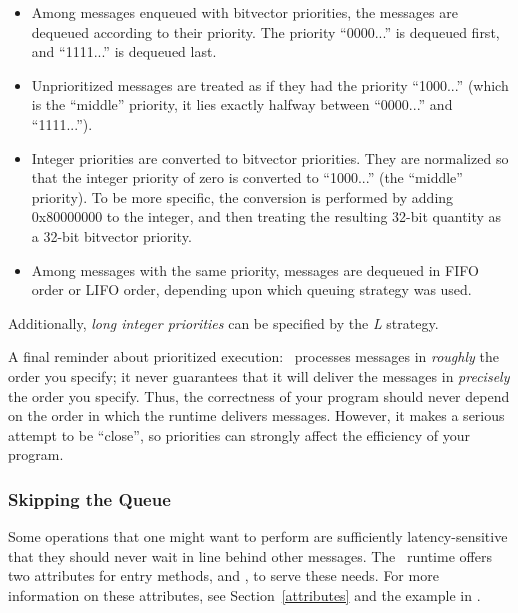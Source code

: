 \begin{itemize}

\item Among messages enqueued with bitvector priorities, the messages are
  dequeued according to their priority.  The priority ``0000...'' is dequeued
  first, and ``1111...'' is dequeued last.

\item Unprioritized messages are treated as if they had the priority
  ``1000...'' (which is the ``middle'' priority, it lies exactly halfway
  between ``0000...'' and ``1111...'').

\item Integer priorities are converted to bitvector priorities.  They are
  normalized so that the integer priority of zero is converted to ``1000...''
  (the ``middle'' priority).  To be more specific, the conversion is performed
  by adding 0x80000000 to the integer, and then treating the resulting 32-bit
  quantity as a 32-bit bitvector priority.

\item Among messages with the same priority, messages are dequeued in FIFO
  order or LIFO order, depending upon which queuing strategy was used.

\end{itemize}

Additionally, {\sl long integer priorities} can be specified by the {\em L}
strategy.

A final reminder about prioritized execution: \charmpp\ processes messages in
{\it roughly} the order you specify; it never guarantees that it will deliver
the messages in {\it precisely} the order you
specify. Thus, the correctness of your program should never depend on the order
in which the runtime delivers messages. However, it makes a serious attempt to
be ``close'', so priorities can strongly affect the efficiency of your program.

\subsubsection{Skipping the Queue}

Some operations that one might want to perform are sufficiently
latency-sensitive that they should never wait in line behind other
messages. The \charmpp\ runtime offers two attributes for entry
methods,  and , to serve these
needs. For more information on these attributes, see
Section~\ref{attributes} and the example in
  .
